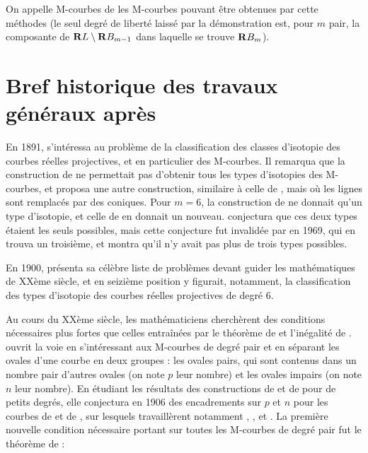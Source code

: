 \documentclass{livre}
\begin{document}
On appelle M-courbes de  les M-courbes pouvant être obtenues par cette méthodes (le seul degré de liberté laissé par la démonstration est, pour $m$ pair, la composante de $\mathbf{R} L \setminus \mathbf{R} B_{m-1} $ dans laquelle se trouve $\mathbf{R} B_m $). 

\section{Bref historique des travaux généraux après }

En 1891,  s'intéressa au problème de la classification des classes d'isotopie des courbes réelles projectives, et en particulier des M-courbes. Il remarqua que la construction de  ne permettait pas d'obtenir tous les types d'isotopies des M-courbes, et proposa une autre construction, similaire à celle de , mais où les lignes sont remplacés par des coniques. Pour $ m= 6 $, la construction de  ne donnait qu'un type d'isotopie, et celle de  en donnait un nouveau.  conjectura que ces deux types étaient les seuls possibles, mais cette conjecture fut invalidée par  en 1969, qui en trouva un troisième, et montra qu'il n'y avait pas plus de trois types possibles.


En 1900,  présenta sa célèbre liste de problèmes devant guider les mathématiques de XXème siècle, et en seizième position y figurait, notamment, la classification des types d'isotopie des courbes réelles projectives de degré 6. 

Au cours du XXème siècle, les mathématiciens cherchèrent des conditions nécessaires plus fortes que celles entraînées par le théorème de  et l'inégalité de .  ouvrit la voie en s'intéressant aux M-courbes de degré pair et en séparant les ovales d'une courbe en deux groupes : les ovales pairs, qui sont contenus dans un nombre pair d'autres ovales (on note $p$ leur nombre) et les ovales impairs (on note $n$ leur nombre). En étudiant les résultats des constructions de  et de  pour de petits degrés, elle conjectura en 1906 des encadrements sur $p$ et $n$ pour les courbes de  et de , sur lesquels travaillèrent notamment , , et . La première nouvelle condition nécessaire portant sur toutes les M-courbes de degré pair fut le théorème de  :


\printbibliography
\end{document}
